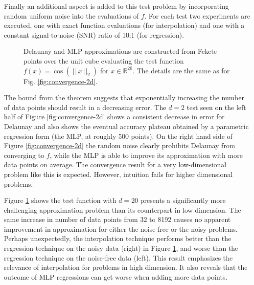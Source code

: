 \documentclass[smallextended,final]{svjour3}  %
\begin{document}
Finally an additional aspect is added to this test problem by
incorporating random uniform noise into the evaluations of $f.$ For
each test two experiments are executed, one with exact function
evaluations (for interpolation) and one with a constant signal-to-noise
(SNR) ratio of 10:1 (for regression).

\begin{figure}
  \centering
  \caption{Delaunay and MLP approximations are constructed from Fekete
    points over the unit cube evaluating the test function $f(x) =
    \cos(\|x\|_2)$ for $x \in \mathbb{R}^{20}$. The details are the
    same as for Fig. \ref{fig:convergence-2d}.}
  \label{fig:convergence-20d}
\end{figure}


The bound from the theorem suggests that exponentially increasing the
number of data points should result in a decreasing error. The $d = 2$
test seen on the left half of Figure \ref{fig:convergence-2d} shows a
consistent decrease in error for Delaunay and also shows the eventual
accuracy plateau obtained by a parametric regression form (the MLP, at
roughly 500 points). On the right hand side of Figure
\ref{fig:convergence-2d} the random noise clearly prohibits Delaunay
from converging to $f$, while the MLP is able to improve its
approximation with more data points on average.  The convergence
result for a very low-dimensional problem like this is expected.
However, intuition fails for higher dimensional problems.

Figure \ref{fig:convergence-20d} shows the test function with $d = 20$
presents a significantly more challenging approximation problem than
its counterpart in low dimension. The same increase in number of data
points from 32 to 8192 causes no apparent improvement in approximation
for either the noise-free or the noisy problems. Perhaps unexpectedly,
the interpolation technique performs better than the regression
technique on the noisy data (right) in Figure
\ref{fig:convergence-20d}, and worse than the regression technique on
the noise-free data (left). This result emphasizes the relevance of
interpolation for problems in high dimension. It also reveals that the
outcome of MLP regressions can get worse when adding more data points.
\end{document}
